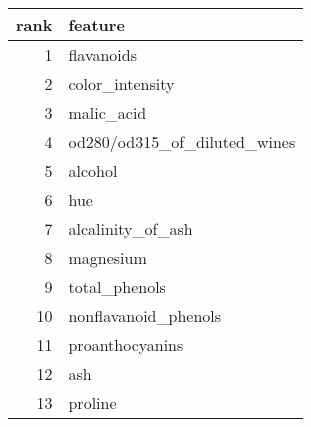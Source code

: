 \begin{tabular}{rl}
\toprule
 rank &                      feature \\
\midrule
    1 &                   flavanoids \\
    2 &              color\_intensity \\
    3 &                   malic\_acid \\
    4 & od280/od315\_of\_diluted\_wines \\
    5 &                      alcohol \\
    6 &                          hue \\
    7 &            alcalinity\_of\_ash \\
    8 &                    magnesium \\
    9 &                total\_phenols \\
   10 &         nonflavanoid\_phenols \\
   11 &              proanthocyanins \\
   12 &                          ash \\
   13 &                      proline \\
\bottomrule
\end{tabular}
